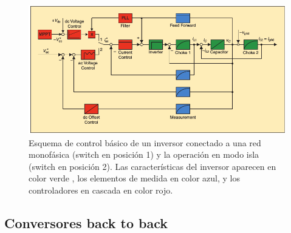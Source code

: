 \documentclass[12pt, letterpaper]{report}
\begin{document}
\begin{figure}[h]
\centering
\includegraphics[width=1\linewidth]{imagenes/tension_pv}
\caption{Esquema de control básico de un inversor conectado a una red monofásica (switch en posición 1) y la operación en modo isla (switch en posición 2). Las características del inversor aparecen en color verde , los elementos de medida en color azul, y los controladores en cascada en color rojo.\cite{Bacha2015}}
\label{fig:tensionpv}
\end{figure}

\subsection{Conversores back to back}
\end{document}
